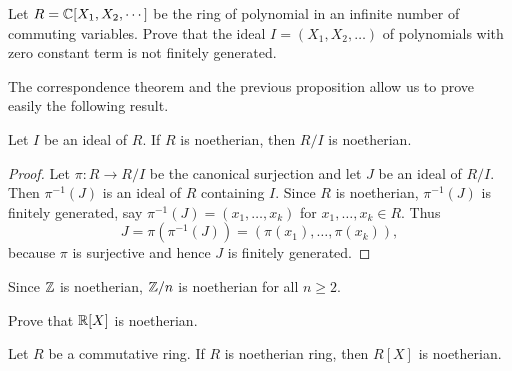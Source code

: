 \begin{exercise}
	Let $R=\mathbb{C}[X_1,X_2,\cdots]$ be the ring of polynomial in an infinite number of 
	commuting variables. Prove that the ideal $I=(X_1,X_2,\dots)$ of polynomials 
	with zero constant term is not finitely generated. 
\end{exercise}


The correspondence theorem and the previous proposition 
allow us to prove easily the following result. 

\begin{proposition}
	Let $I$ be an ideal of $R$. If $R$ is noetherian, then $R/I$ is noetherian.
\end{proposition}

\begin{proof}
	Let $\pi\colon R\to R/I$ be the canonical surjection and let $J$ be an ideal of $R/I$. 
	Then $\pi^{-1}(J)$ is an ideal of $R$ containing $I$. Since 
	$R$ is noetherian, $\pi^{-1}(J)$ is finitely generated, say 
	$\pi^{-1}(J)=(x_1,\dots,x_k)$ for $x_1,\dots,x_k\in R$. Thus 
	\[
	J=\pi(\pi^{-1}(J))=(\pi(x_1),\dots,\pi(x_k)),
	\]
	because $\pi$ is surjective 
	and hence $J$ is finitely generated. 
\end{proof}

Since $\mathbb{Z}$ is noetherian, $\mathbb{Z}/n$ is noetherian for all $n\geq2$. 

\begin{exercise}
	Prove that $\mathbb{R}[X]$ is noetherian. 	
\end{exercise}


\begin{theorem}[Hilbert]
	Let $R$ be a commutative ring. If $R$ is noetherian ring, then $R[X]$ is noetherian.	
\end{theorem}

